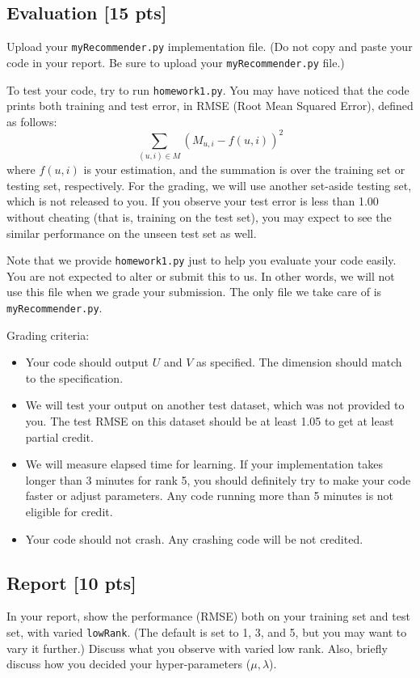 \documentclass[12pt]{article}
\begin{document}
\begin{itemize}
\subsection{Evaluation [15 pts]}
Upload your \texttt{myRecommender.py} implementation file. (Do not
copy and paste your code in your report. Be sure to upload your \texttt{myRecommender.py} file.)

To test your code, try to run \texttt{homework1.py}. You may have
noticed that the code prints both training and test error, in RMSE
(Root Mean Squared Error), defined as follows:
\begin{equation}
\sum_{(u,i) \in M} (M_{u,i} - f(u,i))^2 \nonumber
\end{equation}
where $f(u,i)$ is your estimation, and the summation is over the
training set or testing set, respectively. For the grading, we will
use another set-aside testing set, which is not released to you. If
you observe your test error is less than 1.00 without cheating (that
is, training on the test set), you may expect to see the
similar performance on the unseen test set as well.

Note that we provide \texttt{homework1.py} just to help you evaluate your code easily. You are not expected to alter or submit this to us. In other words, we will not use this file when we grade your submission. The only file we take care of is \texttt{myRecommender.py}.

Grading criteria:
\begin{itemize}
  \item Your code should output $U$ and $V$ as specified. The dimension should match to the specification.
  \item We will test your output on another test dataset, which was not provided to you. The test RMSE on this dataset should be at least 1.05 to get at least partial credit.
  \item We will measure elapsed time for learning. If your implementation takes longer than 3 minutes for rank 5, you should definitely try to make your code faster or adjust parameters. Any code running more than 5 minutes is not eligible for credit.
  \item Your code should not crash. Any crashing code will be not credited.
\end{itemize}

\subsection{Report [10 pts]}
In your report, show the performance (RMSE) both on your training
set and test set, with varied \texttt{lowRank}. (The default is set
to 1, 3, and 5, but you may want to vary it further.) Discuss what
you observe with varied low rank. Also, briefly discuss how you
decided your hyper-parameters ($\mu, \lambda$).


\end{itemize}
\end{document}
